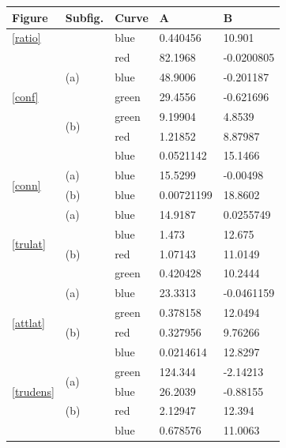 \documentclass[a4paper,12pt,twoside]{report}
\begin{document}
\begin{table}[ht]
\centering
\begin{tabular}{|l|l|l|l|l|}
\hline
Figure & Subfig. & Curve & A & B \\ \hline
\ref{ratio}					&					   & blue & 0.440456 & 10.901 \\ \hline
\multirow{5}{*}{\ref{conf}} & \multirow{3}{*}{(a)} & red & 82.1968 & -0.0200805 \\
 							& 					   & blue & 48.9006 & -0.201187 \\
 							& 					   & green & 29.4556 & -0.621696 \\ \cline{2-5}	
 							& \multirow{2}{*}{(b)} & green & 9.19904 & 4.8539 \\
 							&					   & red & 1.21852 & 8.87987 \\
 							& 					   & blue & 0.0521142 & 15.1466 \\ \hline
\multirow{2}{*}{\ref{conn}} & (a) & blue & 15.5299 & -0.00498 \\ \cline{2-5}	
 							& (b) & blue & 0.00721199 & 18.8602 \\ \hline
\multirow{4}{*}{\ref{trulat}} & (a)				   & blue & 14.9187 & 0.0255749 \\ \cline{2-5}	
 							& \multirow{3}{*}{(b)} & blue & 1.473 & 12.675 \\
 							& 					   & red & 1.07143 & 11.0149 \\ 
 							& 					   & green & 0.420428 & 10.2444 \\ \hline
\multirow{4}{*}{\ref{attlat}} & (a)				   & blue & 23.3313 & -0.0461159 \\ \cline{2-5}	
 							& \multirow{3}{*}{(b)} & green & 0.378158 & 12.0494 \\
 							& 					   & red & 0.327956 & 9.76266 \\ 
 							& 					   & blue & 0.0214614 & 12.8297 \\ \hline
 							\multirow{3}{*}{\ref{trudens}} & \multirow{2}{*}{(a)} & green & 124.344 & -2.14213 \\
 							& 					   & blue & 26.2039 & -0.88155 \\ \cline{2-5}	
 							& (b)				   & red & 2.12947 & 12.394 \\ 
 							& 				       & blue & 0.678576 & 11.0063 \\ \hline
\end{tabular}
\end{table}
\end{document}
